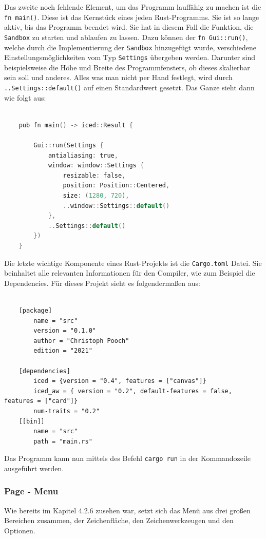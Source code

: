 Das zweite noch fehlende Element, um das Programm lauffähig zu machen ist die \lstinline{fn main()}. Diese ist das Kernstück eines jeden Rust-Programms. Sie ist so lange aktiv, bis das Programm beendet wird.
Sie hat in diesem Fall die Funktion, die \lstinline{Sandbox} zu starten und ablaufen zu lassen. Dazu können der \lstinline{fn Gui::run()}, welche durch die Implementierung der \lstinline{Sandbox} hinzugefügt wurde, verschiedene 
Einstellungsmöglichkeiten vom Typ \lstinline{Settings} übergeben werden. Darunter sind beispielsweise die Höhe und Breite des Programmfensters, ob dieses skalierbar sein soll und anderes. Alles was man nicht per Hand festlegt,
wird durch \lstinline{..Settings::default()} auf einen Standardwert gesetzt. Das Ganze sieht dann wie folgt aus: 

\begin{lstlisting}[language=C]
  
    pub fn main() -> iced::Result {

        Gui::run(Settings {
            antialiasing: true,
            window: window::Settings {
                resizable: false,
                position: Position::Centered,
                size: (1280, 720),
                ..window::Settings::default()
            },
            ..Settings::default()
        })
    }

\end{lstlisting}

Die letzte wichtige Komponente eines Rust-Projekts ist die \lstinline{Cargo.toml} Datei. Sie beinhaltet alle relevanten Informationen für den Compiler, wie zum Beispiel die 
Dependencies. Für dieses Projekt sieht es folgendermaßen aus:

\begin{lstlisting}
  
    [package]
        name = "src"
        version = "0.1.0"
        author = "Christoph Pooch"
        edition = "2021"

    [dependencies]
        iced = {version = "0.4", features = ["canvas"]}
        iced_aw = { version = "0.2", default-features = false, features = ["card"]}
        num-traits = "0.2"
    [[bin]]
        name = "src"
        path = "main.rs"

\end{lstlisting}

Das Programm kann nun mittels des Befehl \lstinline{cargo run} in der Kommandozeile ausgeführt werden.

\subsubsection{Page - Menu}
Wie bereits im Kapitel 4.2.6 zusehen war, setzt sich das Menü aus drei großen Bereichen zusammen, der Zeichenfläche, den Zeichenwerkzeugen und den Optionen. \linebreak

